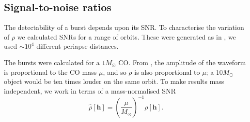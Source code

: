 \subsection{Signal-to-noise ratios}\label{sec:Gal-SNR}

The detectability of a burst depends upon its SNR. To characterise the variation of $\rho$ we calculated SNRs for a range of orbits. These were generated as in , we used $\sim 10^4$ different periapse distances.

The bursts were calculated for a $1 M_\odot$ CO. From , the amplitude of the waveform is proportional to the CO mass $\mu$, and so $\rho$ is also proportional to $\mu$; a $10 M_\odot$ object would be ten times louder on the same orbit. To make results mass independent, we work in terms of a mass-normalised SNR
\begin{equation}
\hat{\rho}[\boldsymbol{h}] = \left(\frac{\mu}{M_\odot}\right)^{-1}\rho[\boldsymbol{h}].
\end{equation}

